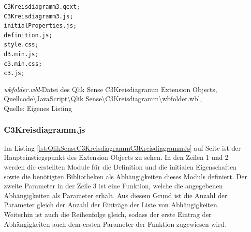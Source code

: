 \begin{listing}[htbp]
\begin{verbatim}
C3Kreisdiagramm3.qext;
C3Kreisdiagramm3.js;
initialProperties.js;
definition.js;
style.css;
d3.min.js;
c3.min.css;
c3.js;
\end{verbatim}
\caption[\textit{wbfolder.wbl}-Datei des Qlik Sense C3Kreisdiagramm Extension Objects ]{\textit{wbfolder.wbl}-Datei des Qlik Sense C3Kreisdiagramm Extension Objects, \\Quellcode\textbackslash{}JavaScript\textbackslash{}Qlik Sense\textbackslash{}C3Kreisdiagramm\textbackslash{}wbfolder.wbl, \\Quelle: Eigenes Listing}
\label{lst:QlikSenseC3KreisdiagrammWbfolderWblDatei}
\end{listing}

\subsubsection{C3Kreisdiagramm.js}
\label{lab:C3KreisdiagrammJs} 

Im Listing \ref{lst:QlikSenseC3KreisdiagrammC3KreisdiagrammJs} auf Seite \pageref{lst:QlikSenseC3KreisdiagrammC3KreisdiagrammJs} ist der Haupteinstiegspunkt des Extension Objects zu sehen. In den Zeilen 1 und 2 werden die erstellten Module für die Definition und die initialen Eigenschaften sowie die benötigten Bibliotheken als Abhängig\-keiten dieses Moduls definiert. Der zweite Parameter in der Zeile 3 ist eine Funktion, welche die angegebenen Abhängig\-keiten als Parameter erhält. Aus diesem Grund ist die Anzahl der Parameter gleich der Anzahl der Einträge der Liste von Abhängig\-keiten. Weiterhin ist auch die Reihenfolge gleich, sodass der erste Eintrag der Abhängig\-keiten auch dem ersten Parameter der Funktion zugewiesen wird.

